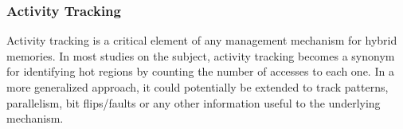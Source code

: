 
	


%


\subsubsection{Activity Tracking}
\label{sec:tracking}

Activity tracking is a critical element of any management mechanism for hybrid memories. In most studies on the subject, activity tracking becomes a synonym for identifying hot regions by counting the number of accesses to each one. In a more generalized approach, it could potentially be extended to track patterns, parallelism, bit flips/faults or any other information useful to the underlying mechanism. %



